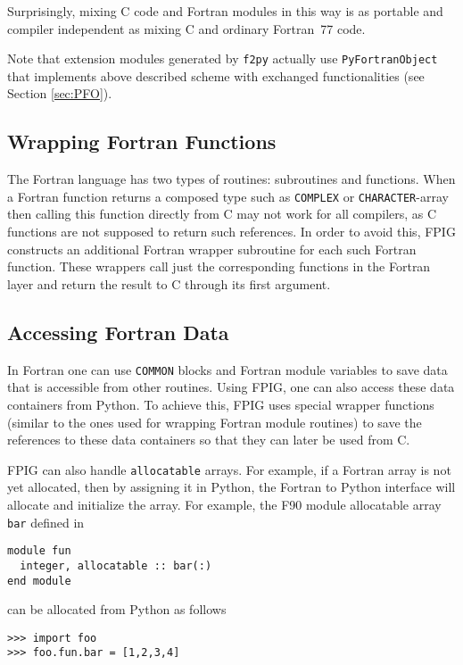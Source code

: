 \documentclass[twocolumn]{article}
\newcommand{\fpy}{\texttt{f2py}\xspace}
\begin{document}
Surprisingly, mixing C code and Fortran modules in this way is as
portable and compiler independent as mixing C and ordinary Fortran~77
code.

Note that extension modules generated by \fpy actually use
\texttt{PyFortranObject} that implements above described scheme with
exchanged functionalities (see Section \ref{sec:PFO}).


\subsection{Wrapping Fortran Functions}
\label{sec:wrapfunc}

The Fortran language has two types of routines: subroutines and
functions. When a Fortran function returns a composed type such as
\texttt{COMPLEX} or \texttt{CHARACTER}-array then calling this
function directly from C may not work for all compilers, as C
functions are not supposed to return such references. In order to
avoid this, FPIG constructs an additional Fortran wrapper subroutine
for each such Fortran function. These wrappers call just the
corresponding functions in the Fortran layer and return the result to
C through its first argument.


\subsection{Accessing Fortran Data}
\label{sec:accsdata}

In Fortran one can use \texttt{COMMON} blocks and Fortran module
variables to save data that is accessible from other routines.  Using
FPIG, one can also access these data containers from Python. To achieve
this, FPIG uses special wrapper functions (similar to the ones used
for wrapping Fortran module routines) to save the references to these
data containers so that they can later be used from C.  

FPIG can also handle \texttt{allocatable} arrays. For example, if a
Fortran array is not yet allocated, then by assigning it in Python,
the Fortran to Python interface will allocate and initialize the
array.  For example, the F90 module allocatable array \texttt{bar}
defined in
\begin{verbatim}
module fun
  integer, allocatable :: bar(:)
end module
\end{verbatim}
can be allocated from Python as follows
\begin{verbatim}
>>> import foo
>>> foo.fun.bar = [1,2,3,4]
\end{verbatim}
\end{document}
